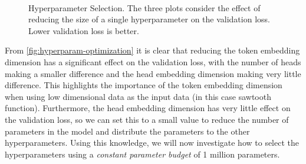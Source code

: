 \documentclass[../../main.tex]{subfiles}
\begin{document}
\begin{figure}[H]
	\centering
	\\
	\caption{Hyperparameter Selection. The three plots consider the effect of reducing the size of a single hyperparameter on the validation loss. Lower validation loss is better.}
	\label{fig:hyperparam-optimization}
\end{figure}

From \autoref{fig:hyperparam-optimization} it is clear that reducing the token embedding dimension has a significant effect on the validation loss, with the number of heads making a smaller difference and the head embedding dimension making very little difference. This highlights the importance of the token embedding dimension when using low dimensional data as the input data (in this case sawtooth function). Furthermore, the head embedding dimension has very little effect on the validation loss, so we can set this to a small value to reduce the number of parameters in the model and distribute the parameters to the other hyperparameters. Using this knowledge, we will now investigate how to select the hyperparameters using a \emph{constant parameter budget} of 1 million parameters. 
\end{document}

